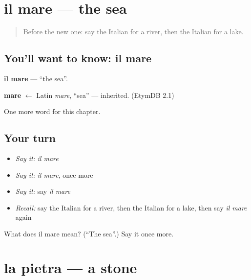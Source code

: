 \section[il mare]{il mare — the sea}

\label{lesson:IT-C65-mare}



\begin{quote}
Before the new one: say the Italian for a river, then the Italian for a lake.
\end{quote}

\subsection*{You'll want to know: il mare}
\textbf{il mare} — \textquotedblleft{}the sea\textquotedblright{}.

\begin{cousinweb}
\textbf{mare} $\leftarrow$ Latin \emph{mare}, \textquotedblleft{}sea\textquotedblright{} — inherited. (EtymDB 2.1)
\end{cousinweb}

\begin{grammarlens}[title={What you've built}]
One more word for this chapter.
\end{grammarlens}

\subsection*{Your turn}
\begin{itemize}
\raggedright
  \item \emph{Say it:} \emph{il mare}
  \item \emph{Say it:} \emph{il mare}, once more
  \item \emph{Say it:} say \emph{il mare}
  \item \emph{Recall:} say the Italian for a river, then the Italian for a lake, then say \emph{il mare} again
\end{itemize}

\begin{tcolorbox}[breakable,colback=teal!4,colframe=teal!35!black,title={Before you move on}]
What does il mare mean? (\textquotedblleft{}The sea\textquotedblright{}.) Say it once more.
\end{tcolorbox}
\section[la pietra]{la pietra — a stone}

